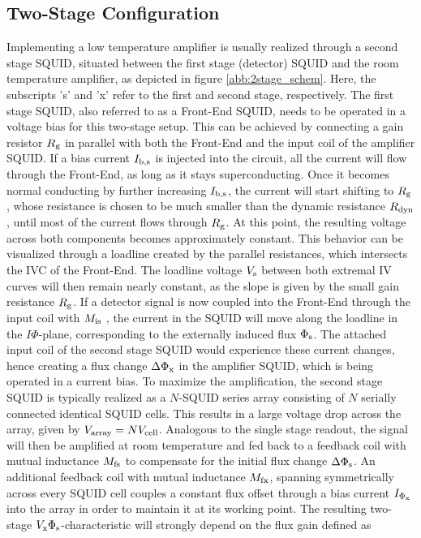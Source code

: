 \subsection{Two-Stage Configuration}

Implementing a low temperature amplifier is usually realized through a second stage SQUID, situated between the first stage (detector) SQUID and the room temperature amplifier, as depicted in figure \ref{abb:2stage_schem}. Here, the subscripts 's' and 'x' refer to the first and second stage, respectively. The first stage SQUID, also referred to as a Front-End SQUID, needs to be operated in a voltage bias for this two-stage setup. This can be achieved by connecting a gain resistor $R_{\rm g}$ in parallel with both the Front-End and the input coil of the amplifier SQUID. If a bias current $I_{\rm b,s}$ is injected into the circuit, all the current will flow through the Front-End, as long as it stays superconducting. Once it becomes normal conducting by further increasing $I_{\rm b,s}$, the current will start shifting to $R_{\rm g}$, whose resistance is chosen to be much smaller than the dynamic resistance $R_{\rm dyn}$, until most of the current flows through $R_{\rm g}$. At this point, the resulting voltage across both components becomes approximately constant. This behavior can be visualized through a loadline created by the parallel resistances, which intersects the IVC of the Front-End. The loadline voltage $V_{\rm s}$ between both extremal IV curves will then remain nearly constant, as the slope is given by the small gain resistance $R_{\rm g}$. If a detector signal is now coupled into the Front-End through the input coil with $M_{\rm is}$ , the current in the SQUID will move along the loadline in the $I\Phi$-plane, corresponding to the externally induced flux $\Phi_{\rm s}$. The attached input coil of the second stage SQUID would experience these current changes, hence creating a flux change $\Delta\Phi_{\rm x}$ in the amplifier SQUID, which is being operated in a current bias. To maximize the amplification, the second stage SQUID is typically realized as a $N$-SQUID series array consisting of $N$ serially connected identical SQUID cells. This results in a large voltage drop across the array, given by $V_{\rm array}=NV_{\rm cell}$. Analogous to the single stage readout, the signal will then be amplified at room temperature and fed back to a feedback coil with mutual inductance $M_{\rm fs}$ to compensate for the initial flux change $\Delta\Phi_{\rm s}$. An additional feedback coil with mutual inductance $M_{\rm fx}$, spanning symmetrically across every SQUID cell couples a constant flux offset through a bias current $I_{\rm \Phi_x}$ into the array in order to maintain it at its working point. The resulting two-stage $V_{\rm x}\Phi_{\rm s}$-characteristic will strongly depend on the flux gain defined as

